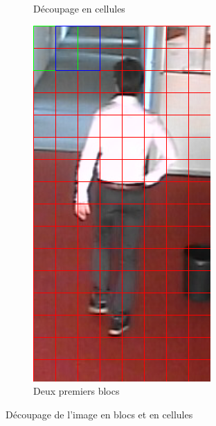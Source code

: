 \documentclass[12pt]{article}
\begin{document}
\begin{figure}[!ht]
\begin{subfigure}{.3\textwidth}
  \caption{Découpage en cellules}
  \label{fig:cell}
\end{subfigure}
\begin{subfigure}{.3\textwidth}
  \centering
  \includegraphics[width=.5\linewidth]{img/block.png}
  \caption{Deux premiers blocs}
  \label{fig:block}
\end{subfigure}
\caption{Découpage de l'image en blocs et en cellules}
\label{fig:decoupage}
\end{figure}
\end{document}
